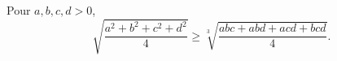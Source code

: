 Pour $a, b, c, d > 0$,
\[ \sqrt{\frac{a^2 + b^2 + c^2 + d^2}{4}} \geq \sqrt[3]{\frac{abc + abd + acd + bcd}{4}}. \]
